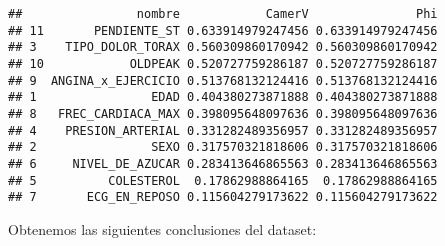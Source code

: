 \documentclass[
]{article}
\newenvironment{Shaded}{\begin{snugshade}}{\end{snugshade}}
\newcommand{\AttributeTok}[1]{\textcolor[rgb]{0.80,0.80,0.80}{#1}}
\newcommand{\ConstantTok}[1]{\textcolor[rgb]{0.86,0.64,0.64}{\textbf{#1}}}
\newcommand{\FunctionTok}[1]{\textcolor[rgb]{0.94,0.94,0.56}{#1}}
\newcommand{\NormalTok}[1]{\textcolor[rgb]{0.80,0.80,0.80}{#1}}
\newcommand{\OtherTok}[1]{\textcolor[rgb]{0.94,0.94,0.56}{#1}}
\newcommand{\SpecialCharTok}[1]{\textcolor[rgb]{0.86,0.64,0.64}{#1}}
\begin{document}
\begin{Shaded}
\end{Shaded}

\begin{verbatim}
##                nombre            CamerV               Phi
## 11       PENDIENTE_ST 0.633914979247456 0.633914979247456
## 3    TIPO_DOLOR_TORAX 0.560309860170942 0.560309860170942
## 10            OLDPEAK 0.520727759286187 0.520727759286187
## 9  ANGINA_x_EJERCICIO 0.513768132124416 0.513768132124416
## 1                EDAD 0.404380273871888 0.404380273871888
## 8   FREC_CARDIACA_MAX 0.398095648097636 0.398095648097636
## 4    PRESION_ARTERIAL 0.331282489356957 0.331282489356957
## 2                SEXO 0.317570321818606 0.317570321818606
## 6     NIVEL_DE_AZUCAR 0.283413646865563 0.283413646865563
## 5          COLESTEROL  0.17862988864165  0.17862988864165
## 7       ECG_EN_REPOSO 0.115604279173622 0.115604279173622
\end{verbatim}

Obtenemos las siguientes conclusiones del dataset:
\end{document}
